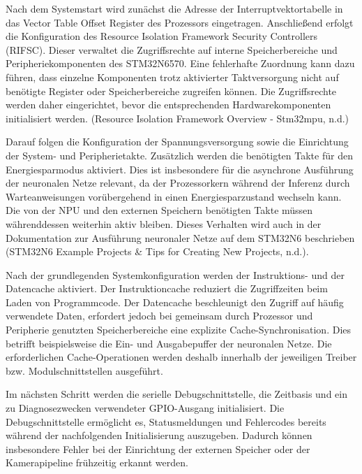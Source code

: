 Nach dem Systemstart wird zunächst die Adresse der Interruptvektortabelle in das Vector Table Offset Register des Prozessors eingetragen. Anschließend erfolgt die Konfiguration des Resource Isolation Framework Security Controllers (RIFSC). Dieser verwaltet die Zugriffsrechte auf interne Speicherbereiche und Peripheriekomponenten des STM32N6570. Eine fehlerhafte Zuordnung kann dazu führen, dass einzelne Komponenten trotz aktivierter Taktversorgung nicht auf benötigte Register oder Speicherbereiche zugreifen können. Die Zugriffsrechte werden daher eingerichtet, bevor die entsprechenden Hardwarekomponenten initialisiert werden. (Resource Isolation Framework Overview - Stm32mpu, n.d.)

Darauf folgen die Konfiguration der Spannungsversorgung sowie die Einrichtung der System- und Peripherietakte. Zusätzlich werden die benötigten Takte für den Energiesparmodus aktiviert. Dies ist insbesondere für die asynchrone Ausführung der neuronalen Netze relevant, da der Prozessorkern während der Inferenz durch Warteanweisungen vorübergehend in einen Energiesparzustand wechseln kann. Die von der NPU und den externen Speichern benötigten Takte müssen währenddessen weiterhin aktiv bleiben. Dieses Verhalten wird auch in der Dokumentation zur Ausführung neuronaler Netze auf dem STM32N6 beschrieben (STM32N6 Example Projects \& Tips for Creating New Projects, n.d.).

Nach der grundlegenden Systemkonfiguration werden der Instruktions- und der Datencache aktiviert. Der Instruktioncache reduziert die Zugriffzeiten beim Laden von Programmcode. Der Datencache beschleunigt den Zugriff auf häufig verwendete Daten, erfordert jedoch bei gemeinsam durch Prozessor und Peripherie genutzten Speicherbereiche eine explizite Cache-Synchronisation. Dies betrifft beispielsweise die Ein- und Ausgabepuffer der neuronalen Netze. Die erforderlichen Cache-Operationen werden deshalb innerhalb der jeweiligen Treiber bzw. Modulschnittstellen ausgeführt.

Im nächsten Schritt werden die serielle Debugschnittstelle, die Zeitbasis und ein zu Diagnosezwecken verwendeter GPIO-Ausgang initialisiert. Die Debugschnittstelle ermöglicht es, Statusmeldungen und Fehlercodes bereits während der nachfolgenden Initialisierung auszugeben. Dadurch können insbesondere Fehler bei der Einrichtung der externen Speicher oder der Kamerapipeline frühzeitig erkannt werden.

